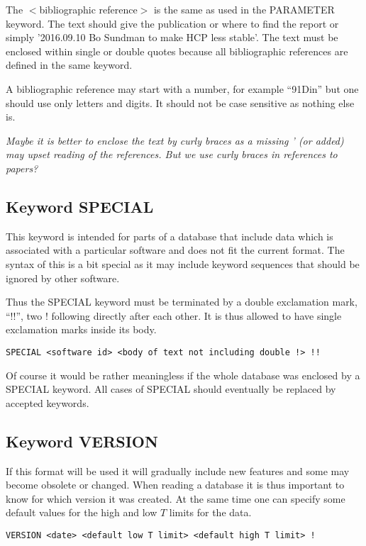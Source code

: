 \documentclass[12pt]{article}
\begin{document}
The $<$bibliographic reference$>$ is the same as used in the PARAMETER
keyword.  The text should give the publication or where to find the
report or simply '2016.09.10 Bo Sundman to make HCP less stable'.  The
text must be enclosed within single or double quotes because all
bibliographic references are defined in the same keyword.

A bibliographic reference may start with a number, for example
``91Din'' but one should use only letters and digits.  It should not
be case sensitive as nothing else is.

{\em Maybe it is better to enclose the text by curly braces {} as
  a missing ' (or added) may upset reading of the references.  But we
  use curly braces in references to papers?}

\subsection{Keyword SPECIAL}

This keyword is intended for parts of a database that include data
which is associated with a particular software and does not fit the
current format.  The syntax of this is a bit special as it may include
keyword sequences that should be ignored by other software.

Thus the SPECIAL keyword must be terminated by a double exclamation
mark, ``!!'', two ! following directly after each other.  It is thus
allowed to have single exclamation marks inside its body.

\begin{verbatim} 
SPECIAL <software id> <body of text not including double !> !!
\end{verbatim} 

Of course it would be rather meaningless if the whole database was
enclosed by a SPECIAL keyword.  All cases of SPECIAL should eventually
be replaced by accepted keywords.

\subsection{Keyword VERSION}

If this format will be used it will gradually include new features and
some may become obsolete or changed.  When reading a database it is
thus important to know for which version it was created.  At the same
time one can specify some default values for the high and low $T$
limits for the data.

\begin{verbatim}
VERSION <date> <default low T limit> <default high T limit> !
\end{verbatim}
\end{document}
